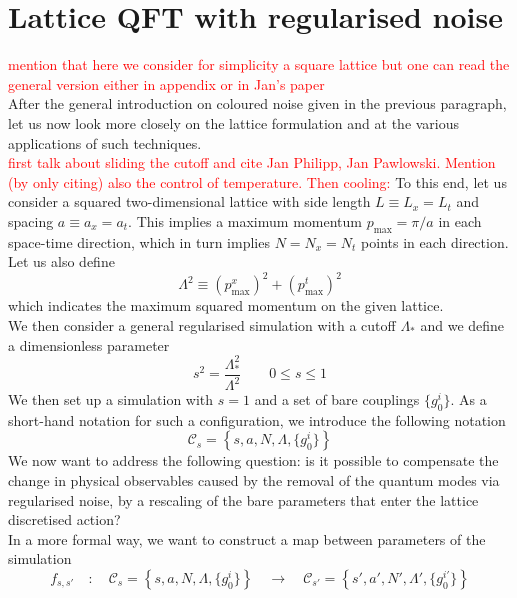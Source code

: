 \section{Lattice QFT with regularised noise}
\textcolor{red}{mention that here we consider for simplicity a square lattice but one can read the general version either in appendix or in Jan's paper} \\
After the general introduction on coloured noise given in the previous paragraph, let us now look more closely on the lattice formulation and at the various applications of such techniques. \\
\textcolor{red}{first talk about sliding the cutoff and cite Jan Philipp, Jan Pawlowski. Mention (by only citing) also the control of temperature. Then cooling:}
To this end, let us consider a squared two-dimensional lattice with side length $L \equiv L_x = L_t$ and spacing $a \equiv a_x = a_t$. This implies a maximum momentum $p_\text{max} = \pi / a$ in each space-time direction, which in turn implies $N=N_x=N_t$ points in each direction. Let us also define 
\begin{equation}
	\Lambda^2 \equiv (p^x_\text{max})^2 + (p^t_\text{max})^2
\end{equation}
which indicates the maximum squared momentum on the given lattice. \\
We then consider a general regularised simulation with a cutoff $\Lambda_*$ and we define a dimensionless parameter
\begin{equation}
	s^2 = \frac{\Lambda_*^2}{\Lambda^2} \qquad 0 \leq s \leq 1
\end{equation}
We then set up a simulation with $s=1$ and a set of bare couplings $\{g^i_0\}$. As a short-hand notation for such a configuration, we introduce the following notation
\begin{equation*}
	\mathcal{C}_s = \left\{s, a, N, \Lambda, \{g^i_0\} \right\}
\end{equation*}
We now want to address the following question:  is it possible to compensate the change in physical observables caused by the removal of the quantum modes via regularised noise, by a rescaling of the bare parameters that enter the lattice discretised action? \\
In a more formal way, we want to construct a map between parameters of the simulation
\begin{equation}
	f_{s,s'} \quad  : \quad  \mathcal{C}_s = \left\{s, a, N, \Lambda, \{g^i_0\} \right\} \quad \to \quad \mathcal{C}_{s'} = \left\{s', a', N', \Lambda', \{g^{i\prime}_0\} \right\}
\end{equation}
